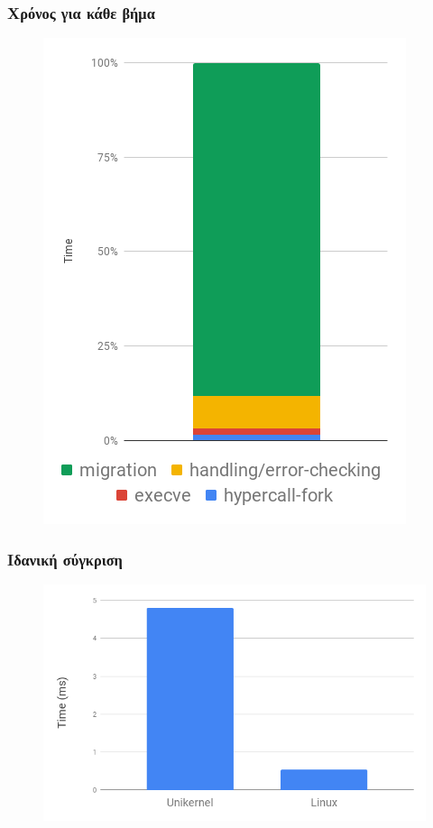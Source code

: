 \documentclass[red,slidestop,notes,compress,mathserif]{beamer}
\begin{document}
\begin{frame}
\frametitle{Χρόνος για κάθε βήμα}
\begin{figure}
\center
\includegraphics[scale=0.42]{figures/fork_breakdown.png}
\end{figure}
\end{frame}

\begin{frame}
\frametitle{Ιδανική σύγκριση}
\begin{figure}
\center
\includegraphics[scale=0.45]{figures/ideal_comparison.png}
\end{figure}
\end{frame}
\end{document}
